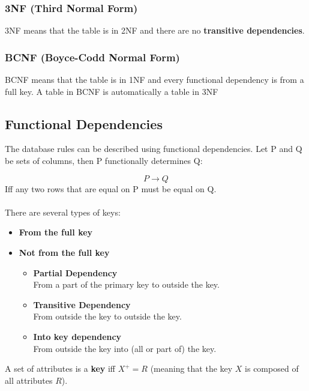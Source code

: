 \documentclass{article}
\begin{document}
\subsubsection{3NF (Third Normal Form)}
3NF means that the table is in 2NF and there are no \textbf{transitive dependencies}.

\subsubsection{BCNF (Boyce-Codd Normal Form)}
BCNF means that the table is in 1NF and every functional dependency is from a full key. A table in BCNF is automatically a table in 3NF

\subsection{Functional Dependencies}
The database rules can be described using functional dependencies. Let P and Q be sets of columns, then P functionally determines Q:

\[ P \rightarrow Q \]
Iff any two rows that are equal on P must be equal on Q. \\ \\
There are several types of keys:

\begin{itemize}
	\item \textbf{From the full key}
	
	\item \textbf{Not from the full key}
	\begin{itemize}
		\item \textbf{Partial Dependency}
		\vspace{.2cm} \\
		From a part of the primary key to outside the key.
		
		\item \textbf{Transitive Dependency}
		\vspace{.2cm} \\
		From outside the key to outside the key.
		
		\item \textbf{Into key dependency}
		\vspace{.2cm} \\
		From outside the key into (all or part of) the key.
	\end{itemize}
\end{itemize}
A set of attributes is a \textbf{key} iff $X^+ = R$ (meaning that the key $X$ is composed of all attributes $R$).
\end{document}
